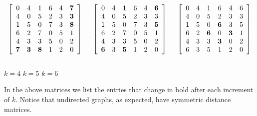 \begin{Example}
\begin{samepage}
{\[
\left[
\begin{array}{cccccc} %
0    & 4   & 1   & 6    & 4    & \textbf{7} \\
4    & 0   & 5   & 2    & 3    & \textbf{3} \\
1    & 5   & 0   & 7    & 3    & \textbf{8} \\
6    & 2   & 7   & 0    & 5    & 1 \\
4    & 3   & 3   & 5    & 0    & 2 \\
\textbf{7} &\textbf{3} & \textbf{8} & 1    & 2    & 0 \\
\end{array}
\right]
\hspace{.5cm}
\left[
\begin{array}{cccccc} %
0    & 4   & 1     & 6    & 4    & \textbf{6} \\
4    & 0   & 5     & 2    & 3    & 3 \\
1    & 5   & 0     & 7    & 3    & \textbf{5} \\
6    & 2   & 7     & 0    & 5    & 1 \\
4    & 3   & 3     & 5    & 0    & 2 \\
\textbf{6} & 3   & \textbf{5} & 1    & 2    & 0 \\
\end{array}
\right]
\hspace{.5cm}
\left[
\begin{array}{cccccc} %
0    & 4   & 1     & 6    & 4    & 6 \\
4    & 0   & 5     & 2    & 3    & 3 \\
1    & 5   & 0     & \textbf{6} & 3    & 5 \\
6    & 2   & \textbf{6} & 0    & \textbf{3} & 1 \\
4    & 3   & 3     & \textbf{3} & 0    & 2 \\
6    & 3   & 5     & 1    & 2    & 0 \\
\end{array}
\right]
\]\\[-5pt]
\hspace*{1in} $k=4$ \hspace{1.2in} $k=5$ \hspace{1.2in} $k=6$
\\
} %
\end{samepage}

In the above matrices we list the entries that change in bold after each
increment of $k$. Notice that undirected graphs, as expected, have
symmetric distance matrices.
\end{Example}

